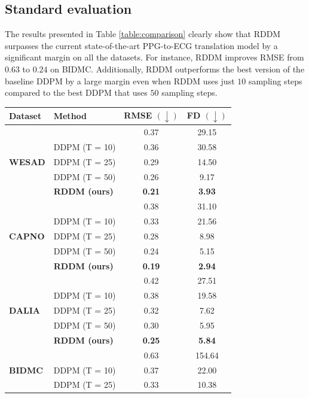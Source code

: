 \documentclass[letterpaper]{article} %
\begin{document}
\subsection{Standard evaluation}
The results presented in Table \ref{table:comparison} clearly show that RDDM surpasses the current state-of-the-art PPG-to-ECG translation model \cite{sarkar2021cardiogan}  by a significant margin on all the datasets. For instance, RDDM improves RMSE from $0.63$ to $0.24$ on BIDMC. Additionally, RDDM outperforms the best version of the baseline DDPM by a large margin even when RDDM uses just $10$ sampling steps compared to the best DDPM that uses $50$ sampling steps.

\begin{table}[t]
\centering
\small
\begin{tabular}{@{}llcc@{}}
\toprule
\textbf{Dataset} & \textbf{Method} & \textbf{RMSE} $\mathbf{(\downarrow)}$ & \textbf{FD} $\mathbf{(\downarrow)}$ \\
\midrule
\multirow{5}{*}{\textbf{WESAD}} & \cite{sarkar2021cardiogan} & 0.37 & 29.15\\
& DDPM (T = 10) & 0.36 & 30.58 \\
& DDPM (T = 25) & 0.29 & 14.50 \\
& DDPM (T = 50) & 0.26 & 9.17 \\
\cmidrule{2-4}
& \textbf{RDDM (ours)} & \textbf{0.21} & \textbf{3.93}\\
\midrule
\multirow{5}{*}{\textbf{CAPNO}} & \cite{sarkar2021cardiogan} & 0.38 & 31.10\\
& DDPM (T = 10) & 0.33 & 21.56\\
& DDPM (T = 25) & 0.28 & 8.98\\
& DDPM (T = 50) & 0.24 & 5.15 \\
\cmidrule{2-4}
& \textbf{RDDM (ours)} & \textbf{0.19} & \textbf{2.94}\\
\midrule
\multirow{5}{*}{\textbf{DALIA}} & \cite{sarkar2021cardiogan} & 0.42 &  27.51\\
& DDPM (T = 10) & 0.38 & 19.58\\
& DDPM (T = 25) & 0.32 & 7.62\\
& DDPM (T = 50) & 0.30 & 5.95 \\
\cmidrule{2-4}
& \textbf{RDDM (ours)} & \textbf{0.25} & \textbf{5.84}\\
\midrule
\multirow{5}{*}{\textbf{BIDMC}} & \cite{sarkar2021cardiogan} & 0.63 & 154.64\\
& DDPM (T = 10) & 0.37 & 22.00 \\
& DDPM (T = 25) & 0.33 & 10.38 \\

\end{tabular}
\end{table}
\end{document}
